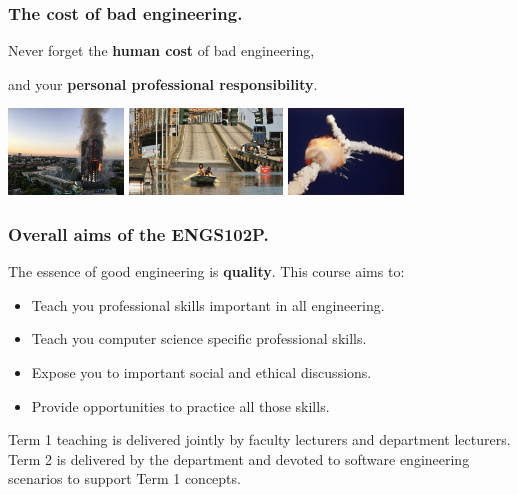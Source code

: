 \documentclass{beamer} %
\newcommand\emc[1]{\textcolor{brightblue}{\textbf{#1}}}
\begin{document}
\begin{frame}
\frametitle{The cost of bad engineering.}

Never forget the \emc{human cost} of bad engineering, 

and your \emc{personal professional responsibility}.

\vspace{10mm}
\centering
\includegraphics[height=23mm]{img/Grenfell.jpg} \quad
\includegraphics[height=23mm]{img/katrina.jpg} \quad
\includegraphics[height=23mm]{img/challenger.jpg}

\end{frame}

\begin{frame}
\frametitle{Overall aims of the ENGS102P.} 

The essence of good engineering is \emc{quality}. This course aims to:

\begin{itemize}
	\item Teach you professional skills important in all engineering.
	\item Teach you computer science specific professional skills.
	\item Expose you to important social and ethical discussions.
	\item Provide opportunities to practice all those skills.
\end{itemize}

\vspace{3mm}
Term 1 teaching is delivered jointly by faculty lecturers and department lecturers. Term 2 is delivered by the department and devoted to software engineering scenarios to support Term 1 concepts.

\end{frame}
\end{document}
